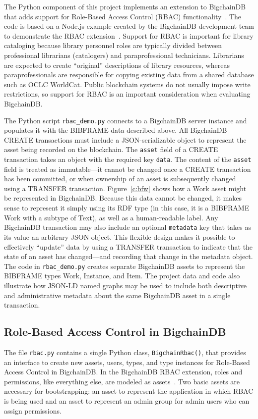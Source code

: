 The Python component of this project implements an extension to
BigchainDB that adds support for Role-Based Access Control (RBAC)
functionality~\cite{gautam18b}. The code is based on a Node.js example
created by the BigchainDB development team to demonstrate the RBAC
extension~\cite{bdb18i}. Support for RBAC is important for library
cataloging because library personnel roles are typically divided between
professional librarians (catalogers) and paraprofessional technicians.
Librarians are expected to create ``original'' descriptions of library
resources, whereas paraprofessionals are responsible for copying existing
data from a shared database such as OCLC WorldCat. Public blockchain systems
do not usually impose write restrictions, so support for RBAC is an
important consideration when evaluating BigchainDB.

The Python script \verb|rbac_demo.py| connects to a BigchainDB server
instance and populates it with the BIBFRAME data described above. All
BigchainDB CREATE transactions must include a JSON-serializable object to
represent the asset being recorded on the blockchain. The \verb|asset| field
of a CREATE transaction takes an object with the required key \verb|data|.
The content of the \verb|asset| field is treated as immutable---it cannot be
changed once a CREATE transaction has been committed, or when ownership of
an asset is subsequently changed using a TRANSFER transaction.
Figure~\ref{c:bfw} shows how a Work asset might be represented in
BigchainDB. Because this data cannot be changed, it makes sense to represent
it simply using its RDF type (in this case, it is a BIBFRAME Work with a
subtype of Text), as well as a human-readable label. Any BigchainDB
transaction may also include an optional \verb|metadata| key that takes as
its value an arbitrary JSON object. This flexible design makes it possible
to effectively ``update'' data by using a TRANSFER transaction to indicate
that the state of an asset has changed---and recording that change in the
metadata object. The code in \verb|rbac_demo.py| creates separate BigchainDB assets
to represent the BIBFRAME types Work, Instance, and Item. The project data and code also illustrate 
how JSON-LD named graphs may be used to include
both descriptive and administrative metadata about the same BigchainDB asset
in a single transaction. 

\subsection{Role-Based Access Control in BigchainDB}
The file \verb|rbac.py| contains a single Python class, \verb|BigchainRbac()|, that provides an 
interface to create new assets, users, types, and type instances for Role-Based Access Control in 
BigchainDB. In the BigchainDB RBAC extension, roles and permissions, like everything else, are 
modeled as assets~\cite{gautam18b}. Two basic assets are necessary for bootstrapping: an 
asset to represent the application in which RBAC is being used and an asset to represent an admin 
group for admin users who can assign permissions. 

